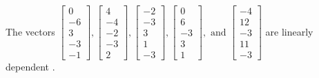 \begin{exercise}
\begin{exerciseStatement}
  \end{exerciseStatement}
  \begin{exerciseAnswer}
   The vectors \(\left[\begin{array}{r}
0 \\
-6 \\
3 \\
-3 \\
-1
\end{array}\right] , \left[\begin{array}{r}
4 \\
-4 \\
-2 \\
-3 \\
2
\end{array}\right] , \left[\begin{array}{r}
-2 \\
-3 \\
3 \\
1 \\
-3
\end{array}\right] , \left[\begin{array}{r}
0 \\
6 \\
-3 \\
3 \\
1
\end{array}\right] , \text{ and } \left[\begin{array}{r}
-4 \\
12 \\
-3 \\
11 \\
-3
\end{array}\right]\) are 
  	 linearly dependent  .
  


  \end{exerciseAnswer}
\end{exercise}